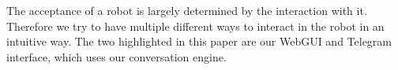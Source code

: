 The acceptance of a robot is largely determined by the interaction with it. Therefore we try to have multiple different ways to interact in the robot in an intuitive way. The two highlighted in this paper are our WebGUI and Telegram\texttrademark\hspace{0em} interface, which uses our conversation engine.

